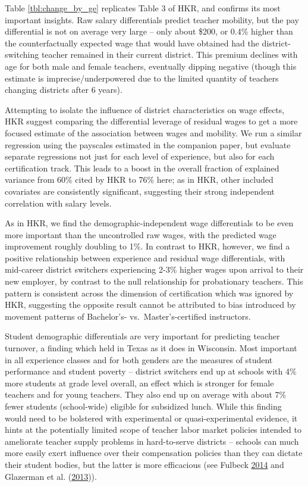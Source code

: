 \documentclass[]{article}
\begin{document}
Table \ref{tbl:change_by_ge} replicates Table 3 of HKR, and confirms its
most important insights. Raw salary differentials predict teacher
mobility, but the pay differential is not on average very large -- only
about \$200, or 0.4\% higher than the counterfactually expected wage
that would have obtained had the district-switching teacher remained in
their current district. This premium declines with age for both male and
female teachers, eventually dipping negative (though this estimate is
imprecise/underpowered due to the limited quantity of teachers changing
districts after 6 years).

Attempting to isolate the influence of district characteristics on wage
effects, HKR suggest comparing the differential leverage of residual
wages to get a more focused estimate of the association between wages
and mobility. We run a similar regression using the payscales estimated
in the companion paper, but evaluate separate regressions not just for
each level of experience, but also for each certification track. This
leads to a boost in the overall fraction of explained variance from 60\%
cited by HKR to 76\% here; as in HKR, other included covariates are
consistently significant, suggesting their strong independent
correlation with salary levels.

As in HKR, we find the demographic-independent wage differentials to be
even more important than the uncontrolled raw wages, with the predicted
wage improvement roughly doubling to 1\%. In contrast to HKR, however,
we find a positive relationship between experience and residual wage
differentials, with mid-career district switchers experiencing 2-3\%
higher wages upon arrival to their new employer, by contrast to the null
relationship for probationary teachers. This pattern is consistent
across the dimension of certification which was ignored by HKR,
suggesting the opposite result cannot be attributed to bias introduced
by movement patterns of Bachelor's- vs.~Master's-certified instructors.

Student demographic differentials are very important for predicting
teacher turnover, a finding which held in Texas as it does in Wisconsin.
Most important in all experience classes and for both genders are the
measures of student performance and student poverty -- district
switchers end up at schools with 4\% more students at grade level
overall, an effect which is stronger for female teachers and for young
teachers. They also end up on average with about 7\% fewer students
(school-wide) eligible for subsidized lunch. While this finding would
need to be bolstered with experimental or quasi-experimental evidence,
it hints at the potentially limited scope of teacher labor market
policies intended to ameliorate teacher supply problems in hard-to-serve
districts -- schools can much more easily exert influence over their
compensation policies than they can dictate their student bodies, but
the latter is more efficacious (see Fulbeck
\protect\hyperlink{ref-fulbeck}{2014} and Glazerman et al.
(\protect\hyperlink{ref-glazerman}{2013})).
\end{document}
